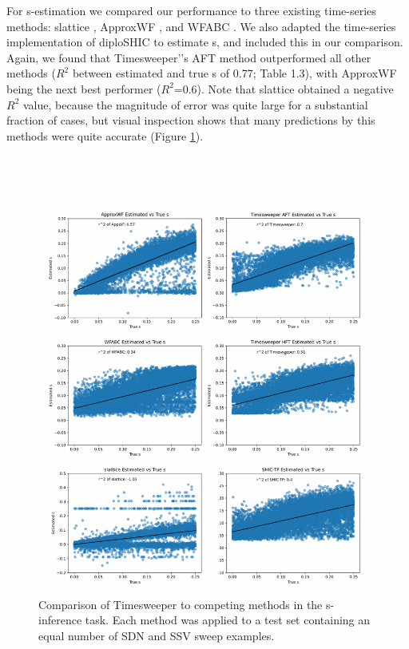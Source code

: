 

For s-estimation we compared our performance to three existing time-series methods: slattice \cite{mathiesonEstimatingSelectionCoefficients2013}, ApproxWF \cite{ferrer-admetllaApproximateMarkovModel2016}, and WFABC \cite{follWFABCWrightFisher2015}. We also adapted the time-series implementation of diploSHIC to estimate s, and included this in our comparison. Again, we found that Timesweeper’'s AFT method outperformed all other methods ($R^2$ between estimated and true s of 0.77; Table 1.3), with ApproxWF being the next best performer ($R^2$=0.6). Note that slattice obtained a negative $R^2$ value, because the magnitude of error was quite large for a substantial fraction of cases, but visual inspection shows that many predictions by this methods were quite accurate (Figure \ref{fig:TS-F4}). 

\begin{figure}
    \centering
    \includegraphics[width=\textwidth]{figures/ch1/Figure_4.pdf}
    \caption[Comparison of Timesweeper to competing methods in the s-inference task]{Comparison of Timesweeper to competing methods in the s-inference task. Each method was applied to a test set containing an equal number of SDN and SSV sweep examples.}
    \label{fig:TS-F4}
\end{figure}

